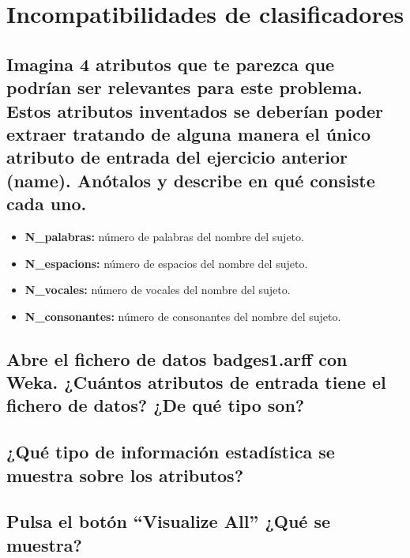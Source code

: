 \documentclass[10pt, spanish, pdftex]{../.memo/plantilla_memorias}
\begin{document}
\section{Incompatibilidades de clasificadores}
\subsection{Imagina 4 atributos que te parezca que podrían ser relevantes para este problema. Estos atributos inventados
se deberían poder extraer tratando de alguna manera el único atributo de entrada del ejercicio anterior
(name). Anótalos y describe en qué consiste cada uno.}
	\begin{itemize}
		\item \textbf{N\_palabras:} número de palabras del nombre del sujeto.
		\item \textbf{N\_espacions:} número de espacios del nombre del sujeto.
		\item \textbf{N\_vocales:} número de vocales del nombre del sujeto.
		\item \textbf{N\_consonantes:} número de consonantes del nombre del sujeto.
	\end{itemize}
\subsection{Abre el fichero de datos badges1.arff con Weka. ¿Cuántos atributos de entrada tiene el fichero de datos?
¿De qué tipo son?}
\subsection{¿Qué tipo de información estadística se muestra sobre los atributos?}
\subsection{Pulsa el botón “Visualize All” ¿Qué se muestra?}
\end{document}
